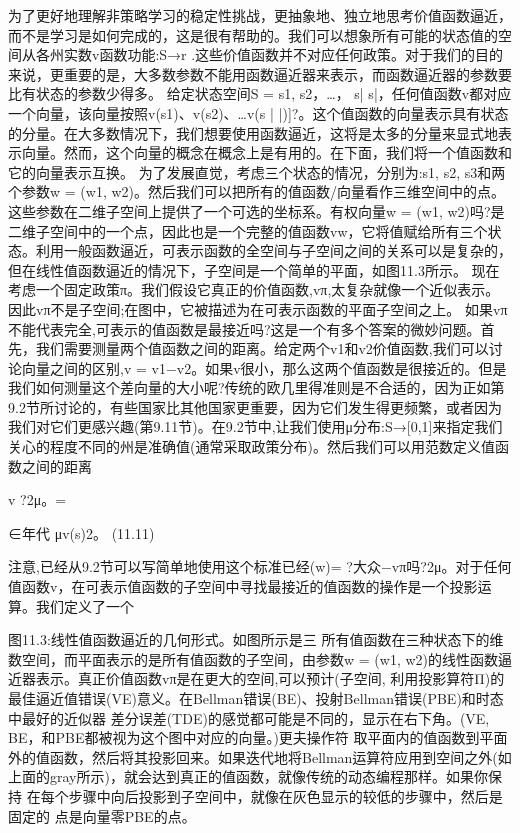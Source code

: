 为了更好地理解非策略学习的稳定性挑战，更抽象地、独立地思考价值函数逼近，而不是学习是如何完成的，这是很有帮助的。我们可以想象所有可能的状态值的空间从各州实数v函数功能:S→r .这些价值函数并不对应任何政策。对于我们的目的来说，更重要的是，大多数参数不能用函数逼近器来表示，而函数逼近器的参数要比有状态的参数少得多。
给定状态空间S = {s1, s2，…， s| s|}，任何值函数v都对应一个向量，该向量按照v(s1)、v(s2)、…v(s | |)]?。这个值函数的向量表示具有状态的分量。在大多数情况下，我们想要使用函数逼近，这将是太多的分量来显式地表示向量。然而，这个向量的概念在概念上是有用的。在下面，我们将一个值函数和它的向量表示互换。
为了发展直觉，考虑三个状态的情况，分别为:{s1, s2, s3}和两个参数w = (w1, w2)。然后我们可以把所有的值函数/向量看作三维空间中的点。这些参数在二维子空间上提供了一个可选的坐标系。有权向量w = (w1, w2)吗?是二维子空间中的一个点，因此也是一个完整的值函数vw，它将值赋给所有三个状态。利用一般函数逼近，可表示函数的全空间与子空间之间的关系可以是复杂的，但在线性值函数逼近的情况下，子空间是一个简单的平面，如图11.3所示。
现在考虑一个固定政策π。我们假设它真正的价值函数,vπ,太复杂就像一个近似表示。因此vπ不是子空间;在图中，它被描述为在可表示函数的平面子空间之上。
如果vπ不能代表完全,可表示的值函数是最接近吗?这是一个有多个答案的微妙问题。首先，我们需要测量两个值函数之间的距离。给定两个v1和v2价值函数,我们可以讨论向量之间的区别,v = v1−v2。如果v很小，那么这两个值函数是很接近的。但是我们如何测量这个差向量的大小呢?传统的欧几里得准则是不合适的，因为正如第9.2节所讨论的，有些国家比其他国家更重要，因为它们发生得更频繁，或者因为我们对它们更感兴趣(第9.11节)。在9.2节中,让我们使用μ分布:S→[0,1]来指定我们关心的程度不同的州是准确值(通常采取政策分布)。然后我们可以用范数定义值函数之间的距离

v ?2μ。=

∈年代
μv(s)2。 					(11.11)

注意,已经从9.2节可以写简单地使用这个标准已经(w)= ?大众−vπ吗?2μ。对于任何值函数v，在可表示值函数的子空间中寻找最接近的值函数的操作是一个投影运算。我们定义了一个

图11.3:线性值函数逼近的几何形式。如图所示是三
所有值函数在三种状态下的维数空间，而平面表示的是所有值函数的子空间，由参数w = (w1, w2)的线性函数逼近器表示。真正价值函数vπ是在更大的空间,可以预计(子空间,
利用投影算符Π)的最佳逼近值错误(VE)意义。在Bellman错误(BE)、投射Bellman错误(PBE)和时态中最好的近似器
差分误差(TDE)的感觉都可能是不同的，显示在右下角。(VE, BE，和PBE都被视为这个图中对应的向量。)更夫操作符
取平面内的值函数到平面外的值函数，然后将其投影回来。如果迭代地将Bellman运算符应用到空间之外(如上面的gray所示)，就会达到真正的值函数，就像传统的动态编程那样。如果你保持
在每个步骤中向后投影到子空间中，就像在灰色显示的较低的步骤中，然后是固定的
点是向量零PBE的点。



